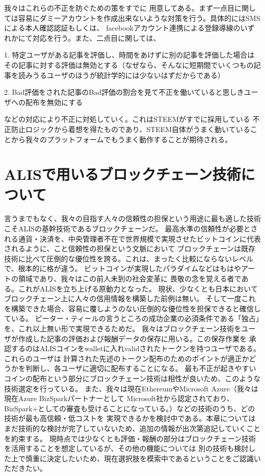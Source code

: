 \documentclass{jsarticle}
\begin{document}
我々はこれらの不正を防ぐための策をすでに
用意してある。まず一点目に関しては容易にダミーアカウントを作成出来ないような対策を行う。具体的にはSMSによる本人確認認証もしくは、
facebookアカウント連携による登録導線のいずれかにて対応を行う。また、二点目に関しては、

1. 特定ユーザがある記事を評価し、時間をあけずに別の記事を評価した場合はその記事に対する評価は無効とする（なぜなら、そんなに短期間でいくつもの記事を読みうるユーザのほうが統計学的には少ないはずだからである）

2. Bad評価をされた記事のBad評価の割合を見て不正を働いていると思しきユーザへの配布を無効にする

などの対応により不正に対処していく。これはSTEEMがすでに採用している
不正防止ロジックから着想を得たものであり、STEEM自体がうまく動いていることから我々のプラットフォームでもうまく動作することが期待される。
\section{ALISで用いるブロックチェーン技術について}
言うまでもなく、我々の目指す人々の信頼性の担保という用途に最も適した技術こそALISの基幹技術であるブロックチェーンだ。
最高水準の信頼性が必要とされる通貨・決済を、中央管理者不在で世界規模で実現させたビットコインに代表されるように、こと信頼性の担保という文脈において
ブロックチェーンは既存技術に比べて圧倒的な優位性を誇る。これは、まったく比較にならないレベルで、根本的に格が違う。
ビットコインが実現したパラダイムなどはもはやアートの領域であり、我々はこの前人未到の社会変革に
畏敬の念を覚える者である。これがALISを立ち上げる原動力となった。
現状、少なくとも日本においてブロックチェーン上に人々の信用情報を構築した前例は無い。
そして一度これを構築できた場合、容易に覆しようのない圧倒的な優位性を担保できると確信している。
ピーター・ティールの言うところの成功企業の必須条件である「独占」を、これ以上無い形で実現できるためだ。
我々はブロックチェーン技術をユーザが作成した記事の評価および報酬データの保存に用いる。この保存作業を
承認するのはALISコインをwalletに入れvalidされたトークンを持つユーザである。これらのユーザは
計算された先述のトークン配布のためのポイントが適正かどうかを判断し、各ユーザに適切に配布することになる。
最も不正が起きやすいコインの配布という部分にブロックチェーン技術は相性が良いため、このような技術選定を行っている。
また、我々は現在EthereumやMicrosoft Azure（我々は現在Azure BizSparkパートナーとして
Microsoft社から認定されており、BizSpark+としての審査も受けることになっている。）などの技術のうち、どの技術が最も高信頼・低コストを
実現できるかを検討中である。本章についてはまだ技術的な検討が完了していないため、追加の情報が出次第追記していくことを約束する。
現時点では少なくとも評価・報酬の部分はブロックチェーン技術を活用することを想定しているが、その他の機能については
別の技術も検討した上で慎重に決定したいため、現在選択肢を模索中であるということをご認識いただきたい。
\end{document}
